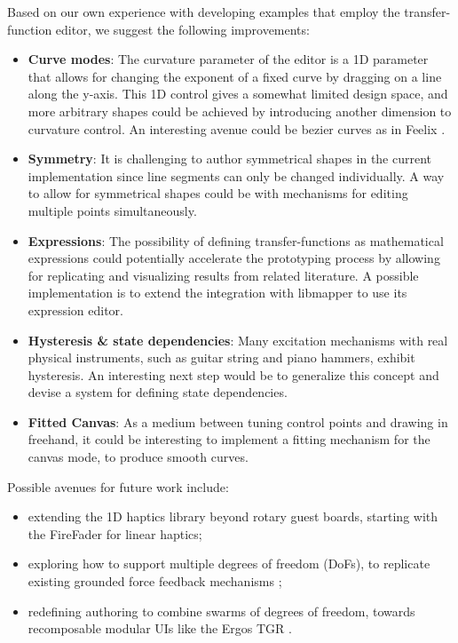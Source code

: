 \documentclass[sigconf]{nimeart}
\begin{document}
Based on our own experience with developing examples that employ the transfer-function editor, we suggest the following improvements:

\begin{itemize}
\item
  \textbf{Curve modes}: The curvature parameter of the editor is a 1D parameter that allows for changing the exponent of a fixed curve by dragging on a line along the y-axis. This 1D control gives a somewhat limited design space, and more arbitrary shapes could be achieved by introducing another dimension to curvature control. An interesting avenue could be bezier curves as in Feelix \cite{Van2020Facilitating}.
\item
  \textbf{Symmetry}: It is challenging to author symmetrical shapes in the current implementation since line segments can only be changed individually. A way to allow for symmetrical shapes could be with mechanisms for editing multiple points simultaneously.
\item
  \textbf{Expressions}: The possibility of defining transfer-functions as mathematical expressions could potentially accelerate the prototyping process by allowing for replicating and visualizing results from related literature. A possible implementation is to extend the integration with libmapper \cite{Malloch2013Libmapper} to use its expression editor.
\item
  \textbf{Hysteresis \& state dependencies}: Many excitation mechanisms with real physical instruments, such as guitar string and piano hammers, exhibit hysteresis. An interesting next step would be to generalize this concept and devise a system for defining state dependencies.
\item
  \textbf{Fitted Canvas}: As a medium between tuning control points and drawing in freehand, it could be interesting to implement a fitting mechanism for the canvas mode, to produce smooth curves.
\end{itemize}

Possible avenues for future work include:

\begin{itemize}
\item
  extending the 1D haptics library beyond rotary guest boards, starting with the FireFader \cite{Berdahl2013FireFader} for linear haptics;
\item
  exploring how to support multiple degrees of freedom (DoFs), to replicate existing grounded force feedback mechanisms \cite{Seifi2019Haptipedia};
\item
  redefining authoring to combine swarms of degrees of freedom, towards recomposable modular UIs like the Ergos TGR \cite{Florens2004ERGOS}.
\end{itemize}
\end{document}
